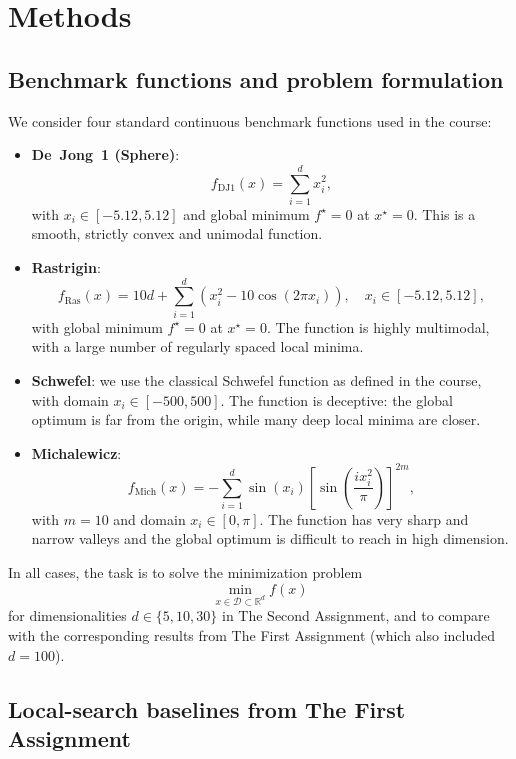 \documentclass[a4paper,11pt]{article}
\begin{document}
\section{Methods}
\label{sec:methods}

\subsection{Benchmark functions and problem formulation}

We consider four standard continuous benchmark functions used in the course:
\begin{itemize}
  \item \textbf{De~Jong~1 (Sphere)}:
    \[
      f_{\mathrm{DJ1}}(x) = \sum_{i=1}^{d} x_i^2,
    \]
    with $x_i \in [-5.12, 5.12]$ and global minimum $f^\star = 0$ at $x^\star = 0$.
    This is a smooth, strictly convex and unimodal function.

  \item \textbf{Rastrigin}:
    \[
      f_{\mathrm{Ras}}(x) = 10 d + \sum_{i=1}^{d}
      \left(x_i^2 - 10 \cos (2\pi x_i)\right), \quad x_i \in [-5.12, 5.12],
    \]
    with global minimum $f^\star = 0$ at $x^\star = 0$. The function is highly
    multimodal, with a large number of regularly spaced local minima.

  \item \textbf{Schwefel}: we use the classical Schwefel function as defined in the
    course, with domain $x_i \in [-500,500]$. The function is deceptive: the
    global optimum is far from the origin, while many deep local minima are closer.

  \item \textbf{Michalewicz}:
    \[
      f_{\mathrm{Mich}}(x) =
      -\sum_{i=1}^{d} \sin(x_i)\left[\sin\!\left(\frac{i x_i^2}{\pi}\right)\right]^{2m},
    \]
    with $m=10$ and domain $x_i \in [0,\pi]$. The function has very sharp and narrow
    valleys and the global optimum is difficult to reach in high dimension.
\end{itemize}

In all cases, the task is to solve the minimization problem
\[
  \min_{x \in \mathcal{D} \subset \mathbb{R}^d} f(x)
\]
for dimensionalities $d \in \{5,10,30\}$ in The Second Assignment, and to compare with the corresponding
results from The First Assignment (which also included $d=100$).

\subsection{Local-search baselines from The First Assignment}
\end{document}
